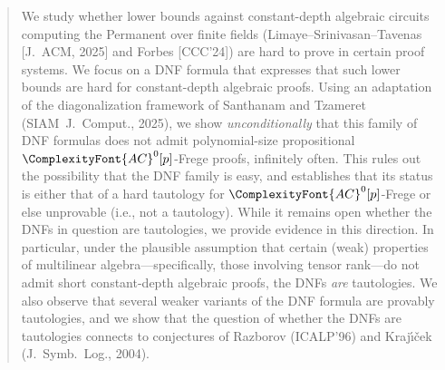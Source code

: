 \documentclass[11pt,letter]{article}
\theoremstyle{remark} %
\newcommand{\ACZ}{\ensuremath{\ComplexityFont{AC}^0}}
\begin{document}
\begin{abstract}
We study whether lower bounds against constant-depth algebraic circuits computing the Permanent over finite fields (Limaye--Srinivasan--Tavenas [{\footnotesize J.~ACM, 2025}] and Forbes [{\footnotesize CCC'24}]) are hard to prove in certain proof systems.
We focus on a DNF formula that expresses that such lower bounds are hard for constant-depth algebraic proofs. 
Using an adaptation of the diagonalization framework of Santhanam and Tzameret ({\footnotesize SIAM~J.~Comput., 2025}), we show \emph{unconditionally} that this family of DNF formulas does not admit polynomial-size propositional $\ACZ[p]$-Frege proofs, infinitely often.  
This rules out the possibility that the DNF family is easy, and establishes that its status is either that of a hard tautology for $\ACZ[p]$-Frege or else unprovable (i.e., not a tautology).  
While it remains open whether the DNFs in question are tautologies, we provide evidence in this direction.  
In particular, under the plausible assumption that certain (weak) properties of multilinear algebra---specifically, those involving tensor rank---do not admit short constant-depth algebraic proofs, the DNFs \emph{are} tautologies.  
We also observe that several weaker variants of the DNF formula are provably tautologies, and we show that the question of whether the DNFs are tautologies connects to conjectures of Razborov ({\footnotesize ICALP'96}) and Kraj\'{\i}\v{c}ek ({\footnotesize J.~Symb.~Log., 2004}).  




\end{abstract}
\end{document}
